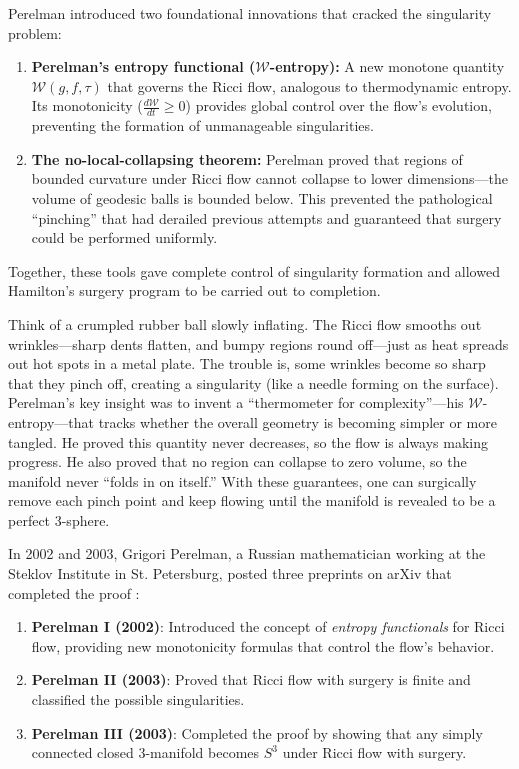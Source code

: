 Perelman introduced two foundational innovations that cracked the singularity problem:
\begin{enumerate}
\item \textbf{Perelman's entropy functional ($\mathcal{W}$-entropy):} A new monotone quantity $\mathcal{W}(g,f,\tau)$ that governs the Ricci flow, analogous to thermodynamic entropy. Its monotonicity ($\frac{d\mathcal{W}}{dt}\geq 0$) provides global control over the flow's evolution, preventing the formation of unmanageable singularities.
\item \textbf{The no-local-collapsing theorem:} Perelman proved that regions of bounded curvature under Ricci flow cannot collapse to lower dimensions---the volume of geodesic balls is bounded below. This prevented the pathological ``pinching'' that had derailed previous attempts and guaranteed that surgery could be performed uniformly.
\end{enumerate}
Together, these tools gave complete control of singularity formation and allowed Hamilton's surgery program to be carried out to completion.

Think of a crumpled rubber ball slowly inflating. The Ricci flow smooths out wrinkles---sharp dents flatten, and bumpy regions round off---just as heat spreads out hot spots in a metal plate. The trouble is, some wrinkles become so sharp that they pinch off, creating a singularity (like a needle forming on the surface). Perelman's key insight was to invent a ``thermometer for complexity''---his $\mathcal{W}$-entropy---that tracks whether the overall geometry is becoming simpler or more tangled. He proved this quantity never decreases, so the flow is always making progress. He also proved that no region can collapse to zero volume, so the manifold never ``folds in on itself.'' With these guarantees, one can surgically remove each pinch point and keep flowing until the manifold is revealed to be a perfect 3-sphere.

\bigskip

In 2002 and 2003, Grigori Perelman, a Russian mathematician working at the Steklov Institute in St. Petersburg, posted three preprints on arXiv that completed the proof \cite{perelman2002,perelman2003a,perelman2003b}:

\begin{enumerate}
\item \textbf{Perelman I (2002)}: Introduced the concept of \emph{entropy functionals} for Ricci flow, providing new monotonicity formulas that control the flow's behavior.
\item \textbf{Perelman II (2003)}: Proved that Ricci flow with surgery is finite and classified the possible singularities.
\item \textbf{Perelman III (2003)}: Completed the proof by showing that any simply connected closed 3-manifold becomes $S^3$ under Ricci flow with surgery.
\end{enumerate}


